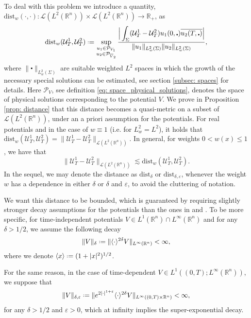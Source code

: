 \documentclass[10pt,a4paper]{amsart}
\theoremstyle{remark}
\theoremstyle{definition}
\newcommand{\R}{\mathbb{R}}
\newcommand*{\defeq}{\mathrel{\vcenter{\baselineskip0.5ex \lineskiplimit0pt
			\hbox{\scriptsize.}\hbox{\scriptsize.}}}%
	=}
\newcommand{\dist}{\mathrm{dist}}
\def\ve{\varepsilon}
\def\lec{\lesssim}
\def\cal{\mathcal}
\def\ovl{\overline}
\def\cd{\centerdot}
\begin{document}
To deal with this problem we introduce a quantity, $\dist_w(\cdot, \cdot): \cal{L}(L^2(\R^n))\times\cal{L}(L^2(\R^n)) \to\R_+$, as 
\[
\dist_w(\cal{U}_T^1, \cal{U}_T^2) \defeq
\sup_{\substack{u_1 \in \cal{P}_{V_1}\\ u_2 \in \cal{P}_{\overline{V}_2}}} \frac{\Big| \displaystyle \int_\Sigma (\cal{U}_T^1-\cal{U}_T^2) u_1(0, \cd) \ovl{u_2(T, \cd)}\Big|}{\|u_1\|_{L^2_w(\Sigma)} \| u_2\|_{L^2_w(\Sigma)}},
\]
where $\|\centerdot\|_{L^2_w(\Sigma)}$ are suitable weighted $L^2$ spaces in which the growth of the necessary special solutions can be estimated, see section \ref{subsec: spaces} for details. Here $\cal{P}_V$, see definition \eqref{eq: space_physical_solutions}, denotes the space of physical solutions corresponding to the potential $V$.
We prove in Proposition \ref{prop: distance} that this distance becomes a quasi-metric on a subset of $\cal{L}(L^2(\R^n))$, under an a priori assumption for the potentials.
For real potentials and in the case of $w\equiv 1$ (i.e. for $L^2_w = L^2$), it holds that $\dist_w(\cal{U}_T^1, \cal{U}_T^2)=\|\cal{U}_T^1 - \cal{U}_T^2\|_{\cal{L}(L^2(\R^n))}$. In general, for weights $0<w(x)\leq1$, we have that
\[
\|\cal{U}_T^1 - \cal{U}_T^2\|_{\cal{L}(L^2(\R^n))} \lec \dist_w(\cal{U}_T^1, \cal{U}_T^2).
\]
In the sequel, we may denote the distance as $\dist_\delta$ or $\dist_{\delta,\ve}$, whenever the weight $w$ has a dependence in either $\delta$ or $\delta$ and $\ve$, to avoid the cluttering of notation.

We want this distance to be bounded, which is guaranteed by requiring slightly stronger decay assumptions for the potentials than the ones in \cite{zbMATH08122191} and \cite{zbMATH07801151}. 
%
To be more specific, for time-independent potentials $V\in L^1(\R^n)\cap L^\infty(\R^n)$ and for any $\delta>1/2$, we assume the following decay 
%
\begin{equation}\label{eq: potential_decay}
\| V \|_\delta \defeq  \| \langle \cdot \rangle^{2\delta} V\|_{L^\infty(\R^n)} < \infty,
\end{equation}
where we denote $\langle x \rangle \defeq (1+|x|^2)^{1/2}$. 

For the same reason, in the case of time-dependent $V\in L^1((0, T); L^\infty(\R^n))$, we suppose that
%
\begin{equation}\label{eq: super_exponential}
		\| V \|_{\delta,\ve} \defeq \|e^{2|\cdot|^{1+\ve}}\langle \cdot \rangle^{2\delta}V \|_{L^\infty((0,T)\times \R^n)} <\infty,
\end{equation}
for any $\delta>1/2$ and $\ve>0$, which at infinity implies the super-exponential decay.
%
\end{document}
